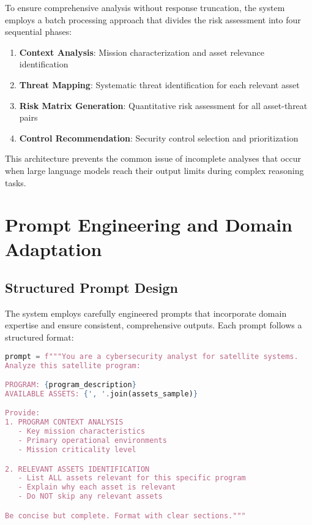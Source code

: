 \documentclass[binding=0.6cm]{sapthesis}
\begin{document}
To ensure comprehensive analysis without response truncation, the system employs a batch processing approach that divides the risk assessment into four sequential phases:

\begin{enumerate}
    \item \textbf{Context Analysis}: Mission characterization and asset relevance identification
    \item \textbf{Threat Mapping}: Systematic threat identification for each relevant asset
    \item \textbf{Risk Matrix Generation}: Quantitative risk assessment for all asset-threat pairs
    \item \textbf{Control Recommendation}: Security control selection and prioritization
\end{enumerate}

This architecture prevents the common issue of incomplete analyses that occur when large language models reach their output limits during complex reasoning tasks.

\section{Prompt Engineering and Domain Adaptation}

\subsection{Structured Prompt Design}

The system employs carefully engineered prompts that incorporate domain expertise and ensure consistent, comprehensive outputs. Each prompt follows a structured format:

\begin{lstlisting}[language=Python, caption=Example Context Analysis Prompt Structure]
prompt = f"""You are a cybersecurity analyst for satellite systems. 
Analyze this satellite program:

PROGRAM: {program_description}
AVAILABLE ASSETS: {', '.join(assets_sample)}

Provide:
1. PROGRAM CONTEXT ANALYSIS
   - Key mission characteristics
   - Primary operational environments
   - Mission criticality level

2. RELEVANT ASSETS IDENTIFICATION
   - List ALL assets relevant for this specific program
   - Explain why each asset is relevant
   - Do NOT skip any relevant assets

Be concise but complete. Format with clear sections."""
\end{lstlisting}
\end{document}
